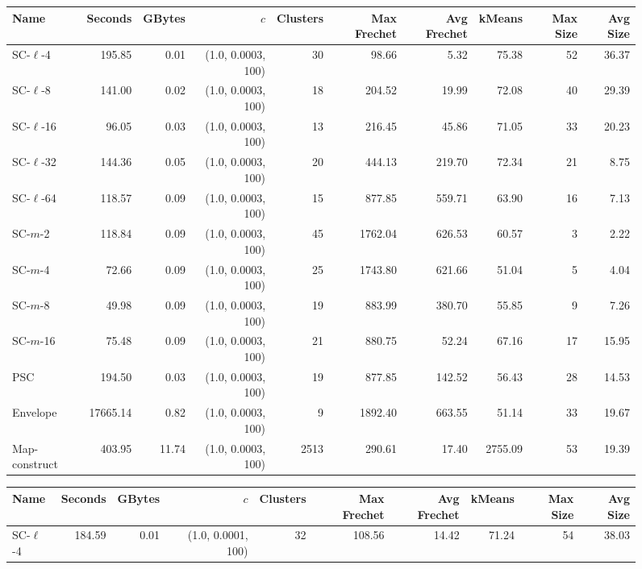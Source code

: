 \documentclass[11pt]{article}
\begin{document}
    \begin{figure} \begin{center}
    \begin{minipage}{\textwidth}
    {
    \begin{tabular}{@{}lrrrrrrrrr@{}}
        \toprule
        Name & Seconds & GBytes & $c$ & Clusters & Max Frechet & Avg Frechet & kMeans & Max Size & Avg Size\\
        \midrule
        SC-$\ell$-4 & 195.85 & 0.01 & (1.0, 0.0003, 100) & 30 & 98.66 & 5.32 & 75.38 & 52 & 36.37\\
SC-$\ell$-8 & 141.00 & 0.02 & (1.0, 0.0003, 100) & 18 & 204.52 & 19.99 & 72.08 & 40 & 29.39\\
SC-$\ell$-16 & 96.05 & 0.03 & (1.0, 0.0003, 100) & 13 & 216.45 & 45.86 & 71.05 & 33 & 20.23\\
SC-$\ell$-32 & 144.36 & 0.05 & (1.0, 0.0003, 100) & 20 & 444.13 & 219.70 & 72.34 & 21 & 8.75\\
SC-$\ell$-64 & 118.57 & 0.09 & (1.0, 0.0003, 100) & 15 & 877.85 & 559.71 & 63.90 & 16 & 7.13\\
SC-$m$-2 & 118.84 & 0.09 & (1.0, 0.0003, 100) & 45 & 1762.04 & 626.53 & 60.57 & 3 & 2.22\\
SC-$m$-4 & 72.66 & 0.09 & (1.0, 0.0003, 100) & 25 & 1743.80 & 621.66 & 51.04 & 5 & 4.04\\
SC-$m$-8 & 49.98 & 0.09 & (1.0, 0.0003, 100) & 19 & 883.99 & 380.70 & 55.85 & 9 & 7.26\\
SC-$m$-16 & 75.48 & 0.09 & (1.0, 0.0003, 100) & 21 & 880.75 & 52.24 & 67.16 & 17 & 15.95\\
PSC& 194.50 & 0.03 & (1.0, 0.0003, 100) & 19 & 877.85 & 142.52 & 56.43 & 28 & 14.53\\
Envelope & 17665.14 & 0.82 & (1.0, 0.0003, 100) & 9 & 1892.40 & 663.55 & 51.14 & 33 & 19.67\\
Map-construct & 403.95 & 11.74 & (1.0, 0.0003, 100) & 2513 & 290.61 & 17.40 & 2755.09 & 53 & 19.39\\
        \bottomrule
    \end{tabular}
    }
    {
    \begin{tabular}{@{}lrrrrrrrrr@{}}
        \toprule
        Name & Seconds & GBytes & $c$ & Clusters & Max Frechet & Avg Frechet & kMeans & Max Size & Avg Size\\
        \midrule
        SC-$\ell$-4 & 184.59 & 0.01 & (1.0, 0.0001, 100) & 32 & 108.56 & 14.42 & 71.24 & 54 & 38.03\\

\end{tabular}}
\end{minipage}
\end{center}
\end{figure}
\end{document}
